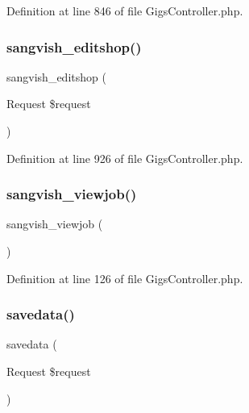 Definition at line 846 of file Gigs\+Controller.\+php.

\mbox{\label{class_responsive_1_1_http_1_1_controllers_1_1_gigs_controller_a91ccb31ea3618b9969dcd4bca9108803}} 
\subsubsection{\texorpdfstring{sangvish\_editshop()}{sangvish\_editshop()}}
{\footnotesize\ttfamily sangvish\+\_\+editshop (\begin{DoxyParamCaption}\item[{Request}]{\$request }\end{DoxyParamCaption})}



Definition at line 926 of file Gigs\+Controller.\+php.

\mbox{\label{class_responsive_1_1_http_1_1_controllers_1_1_gigs_controller_a3c33afeae3bc99aae236c2cf6cc8de1d}} 
\subsubsection{\texorpdfstring{sangvish\_viewjob()}{sangvish\_viewjob()}}
{\footnotesize\ttfamily sangvish\+\_\+viewjob (\begin{DoxyParamCaption}{ }\end{DoxyParamCaption})}



Definition at line 126 of file Gigs\+Controller.\+php.

\mbox{\label{class_responsive_1_1_http_1_1_controllers_1_1_gigs_controller_a39992cc1c190dd16b2de573a70a7f5dc}} 
\subsubsection{\texorpdfstring{savedata()}{savedata()}}
{\footnotesize\ttfamily savedata (\begin{DoxyParamCaption}\item[{Request}]{\$request }\end{DoxyParamCaption})\hspace{0.3cm}{\ttfamily [protected]}}



